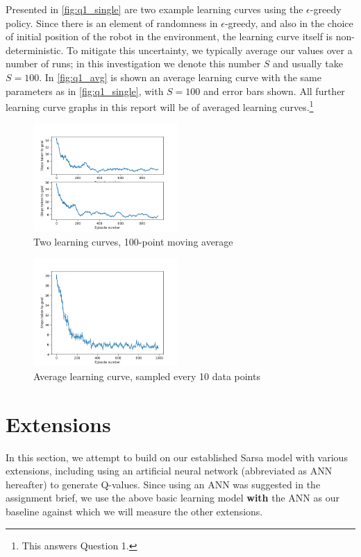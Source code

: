 \documentclass[a4paper, 11pt, twocolumn, final]{article} %
\begin{document}
Presented in \autoref{fig:q1_single} are two example learning curves using the
$\epsilon$-greedy policy.  Since there is an element of randomness in
$\epsilon$-greedy, and also in the choice of initial position of the robot in
the environment, the learning curve itself is non-deterministic.  To mitigate
this uncertainty, we typically average our values over a number of runs; in this
investigation we denote this number $S$ and usually take $S = 100$.  In
\autoref{fig:q1_avg} is shown an average learning curve with the same parameters
as in \autoref{fig:q1_single}, with $S = 100$ and error bars shown.  All further
learning curve graphs in this report will be of averaged learning
curves.\footnote{This answers Question 1.}

\begin{figure}
  \includegraphics[width=0.49\textwidth]{figures/q1_figure_single.png}
  \caption{Two learning curves, 100-point moving average}
  \label{fig:q1_single}
\end{figure}

\begin{figure}
  \includegraphics[width=0.49\textwidth]{figures/q1_figure_avg.png}
  \caption{Average learning curve, sampled every 10 data points}
  \label{fig:q1_avg}
\end{figure}

\section{Extensions} In this section, we attempt to build on our established
Sarsa model with various extensions, including using an artificial neural
network (abbreviated as ANN hereafter) to generate Q-values.  Since using an ANN
was suggested in the assignment brief, we use the above basic learning model
\textbf{with} the ANN as our baseline against which we will measure the other
extensions.
\end{document}
